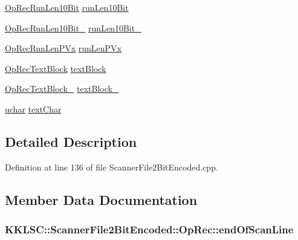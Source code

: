 \begin{DoxyCompactItemize}
\item 
\hyperlink{struct_scanner_file2_bit_encoded_1_1_op_rec_run_len10_bit}{Op\+Rec\+Run\+Len10\+Bit} \hyperlink{union_scanner_file2_bit_encoded_1_1_op_rec_adc5282dfa52e325ea8573426cd07e6b4}{run\+Len10\+Bit}
\item 
\hyperlink{struct_scanner_file2_bit_encoded_1_1_op_rec_run_len10_bit__2}{Op\+Rec\+Run\+Len10\+Bit\+\_} \hyperlink{union_scanner_file2_bit_encoded_1_1_op_rec_a786d211e6608cbb71bab089f19571d96}{run\+Len10\+Bit\+\_}
\item 
\hyperlink{struct_scanner_file2_bit_encoded_1_1_op_rec_run_len_p_vx}{Op\+Rec\+Run\+Len\+P\+Vx} \hyperlink{union_scanner_file2_bit_encoded_1_1_op_rec_aa483ca17a2220cce31b6221a6d0489e8}{run\+Len\+P\+Vx}
\item 
\hyperlink{struct_scanner_file2_bit_encoded_1_1_op_rec_text_block}{Op\+Rec\+Text\+Block} \hyperlink{union_scanner_file2_bit_encoded_1_1_op_rec_abb52dc273b995911ac43478bc0fa7131}{text\+Block}
\item 
\hyperlink{struct_scanner_file2_bit_encoded_1_1_op_rec_text_block__2}{Op\+Rec\+Text\+Block\+\_} \hyperlink{union_scanner_file2_bit_encoded_1_1_op_rec_a248430767d96c07d738f9b7209b324e4}{text\+Block\+\_}
\item 
\hyperlink{namespace_k_k_b_ace9969169bf514f9ee6185186949cdf7}{uchar} \hyperlink{union_scanner_file2_bit_encoded_1_1_op_rec_a78fb9f5fab109dc2c86190ad9492c067}{text\+Char}
\end{DoxyCompactItemize}


\subsection{Detailed Description}


Definition at line 136 of file Scanner\+File2\+Bit\+Encoded.\+cpp.



\subsection{Member Data Documentation}
\subsubsection[{\texorpdfstring{end\+Of\+Scan\+Line}{endOfScanLine}}]{ K\+K\+L\+S\+C\+::\+Scanner\+File2\+Bit\+Encoded\+::\+Op\+Rec\+::end\+Of\+Scan\+Line}\hypertarget{union_scanner_file2_bit_encoded_1_1_op_rec_af78b211aa9eb5538eac7b79cc4ab9908}{}\label{union_scanner_file2_bit_encoded_1_1_op_rec_af78b211aa9eb5538eac7b79cc4ab9908}


